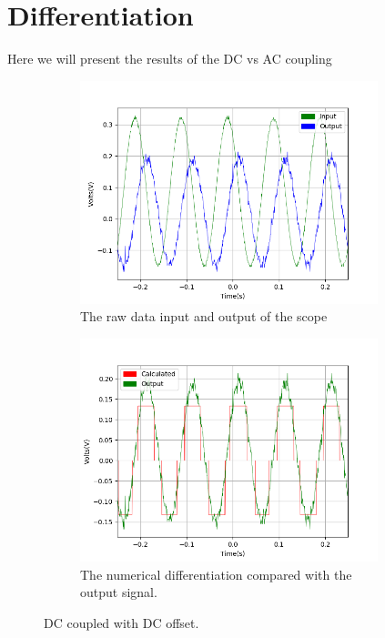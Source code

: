 \clearpage

\section{Differentiation} \label{append:diff}

Here we will present the results of the DC vs AC coupling

\begin{figure}[h!]
\centering
\begin{subfigure}[t]{.475\textwidth}
  \centering
  \includegraphics[width=0.95\textwidth, height=0.20\textheight]{figures/Differentiation/scope_20raw.png}
  \caption{The raw data input and output of the scope}
 \label{fig:diff_DC_raw}
\end{subfigure}\hfill
\begin{subfigure}[t]{.475\textwidth}
  \centering
  \includegraphics[width=0.95\textwidth, height=0.20\textheight]{figures/Differentiation/scope_20_calc_behind.png}
  \caption{The numerical differentiation compared with the output signal.}
\label{fig:diff_DC_filter}
\end{subfigure}
\caption{DC coupled with DC offset.}
\label{fig:diff_DC}
\end{figure}


